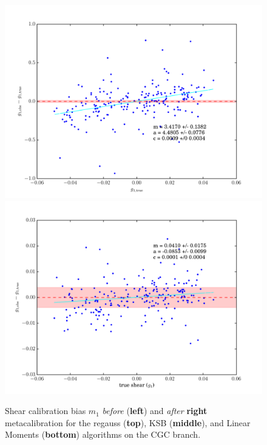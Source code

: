 \documentclass[iop]{emulateapj}
\begin{document}
\begin{figure}[t]
\begin{center}
\includegraphics[width=0.49\linewidth]{./Plots/m1-no_corrections-moments.pdf}
\includegraphics[width=0.49\linewidth]{./Plots/m1-moments-opt-shear_plots.pdf}
\end{center}
\caption{Shear calibration bias $m_1$ {\it before} ({\bf left}) and
  {\it after} {\bf right} metacalibration for the regauss ({\bf top}),
  KSB ({\bf middle}), and Linear Moments ({\bf bottom}) algorithms on
  the CGC branch.}
\end{figure}
\end{document}
